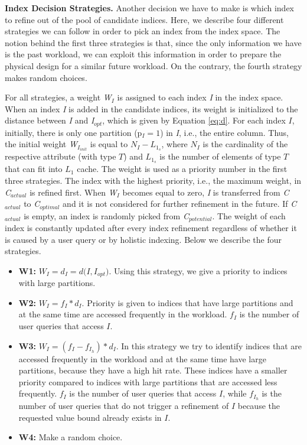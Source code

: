 \textbf{Index Decision Strategies.} 
Another decision we have to make is which index to refine out of the pool of candidate indices.
Here, we describe four different strategies we can follow in order to pick an index from the index space.
The notion behind the first three strategies is that, since the only information we have is the past workload, 
we can exploit this information in order to prepare the physical design for a similar future workload.
On the contrary, the fourth strategy makes random choices.

For all strategies, a weight \emph{W$_{I}$} is assigned to each index \emph{I} in the index space.
When an index \emph{I} is added in the candidate indices, its weight is initialized 
to the distance between \emph{I} and \emph{I$_{opt}$}, which is given by Equation \eqref{eq:d}. 
For each index $I$, initially, there is only one partition (p$_{I}=1$) in \emph{I}, i.e., the entire column. 
Thus, the initial weight \emph{W$_{I_{init}}$} is equal to $N_{I} - L_{1_{s}}$,
where $N_{I}$ is the cardinality of the respective attribute (with type $T$) and $L_{1_{s}}$ is the number of elements of type $T$ that can fit into $L_{1}$ cache. 
The weight is used as a priority number in the first three strategies.
The index with the highest priority, i.e., the maximum weight,  in \emph{C$_{actual}$} is refined first.
When \emph{W$_{I}$} becomes equal to zero, \emph{I} is transferred 
from \emph{C$_{actual}$} to \emph{C$_{optimal}$} and it is not considered for further refinement in the future.
If \emph{C$_{actual}$} is empty, an index is randomly picked from \emph{C$_{potential}$}.
The weight of each index is constantly updated after every index refinement regardless of whether it is caused
by a user query or by holistic indexing.
Below we describe the four strategies.

\vspace{-0.2cm}
\begin{itemize}
  \setlength{\itemsep}{0cm}
  \setlength{\parskip}{0cm}
  \setlength{\parsep}{0cm}
\item \textbf{W1:} $W_{I}=d_{I}=d(I,$$I_{opt})$. Using this strategy, we give a priority to indices with large partitions.  
\item \textbf{W2:} $W_{I}=f_{I}*d_{I}$. Priority is given to indices that have large partitions and at the same time are accessed frequently in the workload. $f_{I}$ is the number of user queries that access $I$.
\item \textbf{W3:} $W_{I}=(f_{I}-f_{I_{h}})*d_{I}$. In this strategy we try to identify indices that are accessed frequently in the workload and at the same time have large partitions, because they have a high hit rate. These indices have a smaller priority compared to indices with large partitions that are accessed less frequently. $f_{I}$ is the number of user queries that access $I$, while $f_{I_{h}}$ is the number of user queries that do not trigger a refinement of $I$ because the requested value bound already exists in $I$.
\item \textbf{W4:} Make a random choice.
\end{itemize}
\vspace{-0.2cm}

